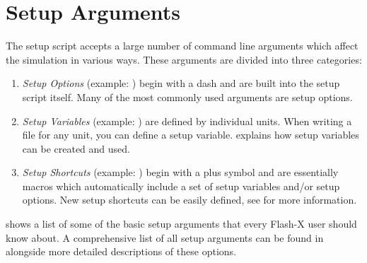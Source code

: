 \section{Setup Arguments}

The setup script accepts a large number of command line arguments
which affect the simulation in various ways. These arguments are divided
into three categories:

\begin{enumerate}
  \item \textit{Setup Options} (example: ) begin with a
    dash and are built into the setup script itself. Many of the most
    commonly used arguments are setup options.
  \item \textit{Setup Variables} (example: )
    are defined by individual units. When writing a  file
    for any unit, you can define a setup
    variable.  explains how setup variables
    can be created and used.
  \item \textit{Setup Shortcuts} (example: ) begin with a
    plus symbol and are essentially macros which automatically include
    a set of setup variables and/or setup options. New setup shortcuts
    can be easily defined, see  for more
    information.
\end{enumerate}

 shows a list of some of the basic setup
arguments that every Flash-X user should know about. A comprehensive
list of all setup arguments can be found in 
alongside more detailed descriptions of these options.

